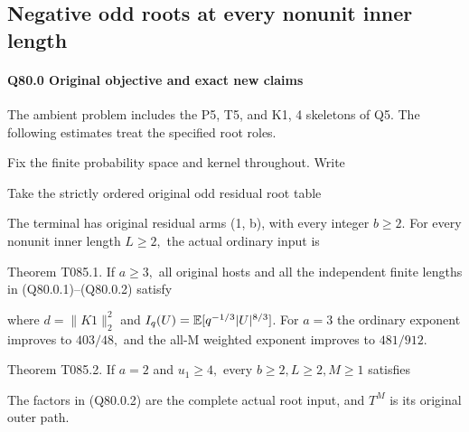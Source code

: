 \subsection{Negative odd roots at every nonunit inner length}\label{proof:Q5-C080}
\paragraph{Q80.0 Original objective and exact new claims}

The ambient problem includes the P5, T5, and K1, 4 skeletons of Q5.
The following estimates treat the specified root roles.

Fix the finite probability space and kernel throughout. Write


Take the strictly ordered original odd residual root table


The terminal has original residual arms (1, b), with every integer \(b\ge 2.\)
For every nonunit inner length \(L\ge 2,\allowbreak \) the actual ordinary input is


Theorem T085.1. If \(a\ge 3,\allowbreak \) all original hosts and all the independent
finite lengths in (Q80.0.1)--(Q80.0.2) satisfy


where \(d=\lVert K1\rVert _2^2\) and \(I_q(U)=\mathbb E[q^{-1/3}|U|^{8/3}]\).
For \(a=3\) the ordinary exponent improves to \(403/48,\allowbreak \) and the all-M
weighted exponent improves to \(481/912.\)

Theorem T085.2. If \(a=2\) and \(u_1\ge 4,\allowbreak \) every \(b\ge 2,\allowbreak  L\ge 2,\allowbreak  M\ge 1\) satisfies


The factors in (Q80.0.2)
are the complete actual root input, and \(T^M\) is its original outer path.



